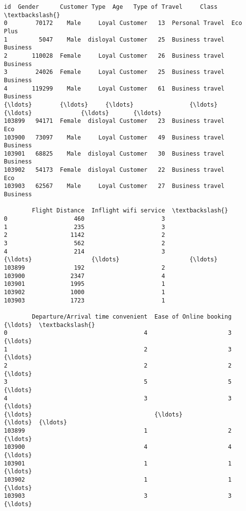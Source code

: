 \documentclass[11pt]{article}
\makeatletter
\newcommand{\boxspacing}{\kern\kvtcb@left@rule\kern\kvtcb@boxsep}
\newcommand{\prompt}[4]{
        {\ttfamily\llap{{\color{#2}[#3]:\hspace{3pt}#4}}\vspace{-\baselineskip}}
    }
\makeatother
\begin{document}
            \begin{tcolorbox}[breakable, size=fbox, boxrule=.5pt, pad at break*=1mm, opacityfill=0]
\prompt{Out}{outcolor}{5}{\boxspacing}
\begin{Verbatim}[commandchars=\\\{\}]
            id  Gender      Customer Type  Age   Type of Travel     Class  \textbackslash{}
0        70172    Male     Loyal Customer   13  Personal Travel  Eco Plus
1         5047    Male  disloyal Customer   25  Business travel  Business
2       110028  Female     Loyal Customer   26  Business travel  Business
3        24026  Female     Loyal Customer   25  Business travel  Business
4       119299    Male     Loyal Customer   61  Business travel  Business
{\ldots}        {\ldots}     {\ldots}                {\ldots}  {\ldots}              {\ldots}       {\ldots}
103899   94171  Female  disloyal Customer   23  Business travel       Eco
103900   73097    Male     Loyal Customer   49  Business travel  Business
103901   68825    Male  disloyal Customer   30  Business travel  Business
103902   54173  Female  disloyal Customer   22  Business travel       Eco
103903   62567    Male     Loyal Customer   27  Business travel  Business

        Flight Distance  Inflight wifi service  \textbackslash{}
0                   460                      3
1                   235                      3
2                  1142                      2
3                   562                      2
4                   214                      3
{\ldots}                 {\ldots}                    {\ldots}
103899              192                      2
103900             2347                      4
103901             1995                      1
103902             1000                      1
103903             1723                      1

        Departure/Arrival time convenient  Ease of Online booking  {\ldots}  \textbackslash{}
0                                       4                       3  {\ldots}
1                                       2                       3  {\ldots}
2                                       2                       2  {\ldots}
3                                       5                       5  {\ldots}
4                                       3                       3  {\ldots}
{\ldots}                                   {\ldots}                     {\ldots}  {\ldots}
103899                                  1                       2  {\ldots}
103900                                  4                       4  {\ldots}
103901                                  1                       1  {\ldots}
103902                                  1                       1  {\ldots}
103903                                  3                       3  {\ldots}


\end{Verbatim}
\end{tcolorbox}
\end{document}
